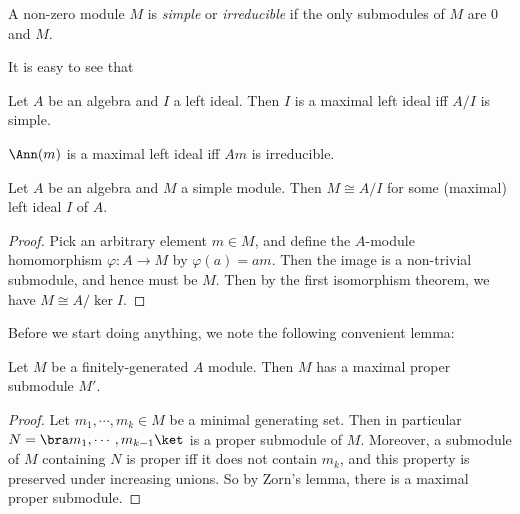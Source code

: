 \documentclass[a4paper]{article}
\begin{document}
\begin{defi}
  A non-zero module $M$ is \emph{simple} or \emph{irreducible} if the only submodules of $M$ are $0$ and $M$.
\end{defi}

It is easy to see that
\begin{prop}
  Let $A$ be an algebra and $I$ a left ideal. Then $I$ is a maximal left ideal iff $A/I$ is simple.
\end{prop}

\begin{eg}
  $\Ann(m)$ is a maximal left ideal iff $Am$ is irreducible.
\end{eg}

\begin{prop}
  Let $A$ be an algebra and $M$ a simple module. Then $M \cong A/I$ for some (maximal) left ideal $I$ of $A$.
\end{prop}

\begin{proof}
  Pick an arbitrary element $m \in M$, and define the $A$-module homomorphism $\varphi: A \to M$ by $\varphi(a) = am$. Then the image is a non-trivial submodule, and hence must be $M$. Then by the first isomorphism theorem, we have $M \cong A/\ker I$.
\end{proof}

Before we start doing anything, we note the following convenient lemma:
\begin{lemma}
  Let $M$ be a finitely-generated $A$ module. Then $M$ has a maximal proper submodule $M'$.
\end{lemma}

\begin{proof}
  Let $m_1, \cdots, m_k \in M$ be a minimal generating set. Then in particular $N = \bra m_1, \cdots, m_{k - 1}\ket$ is a proper submodule of $M$. Moreover, a submodule of $M$ containing $N$ is proper iff it does not contain $m_k$, and this property is preserved under increasing unions. So by Zorn's lemma, there is a maximal proper submodule.
\end{proof}
\end{document}
